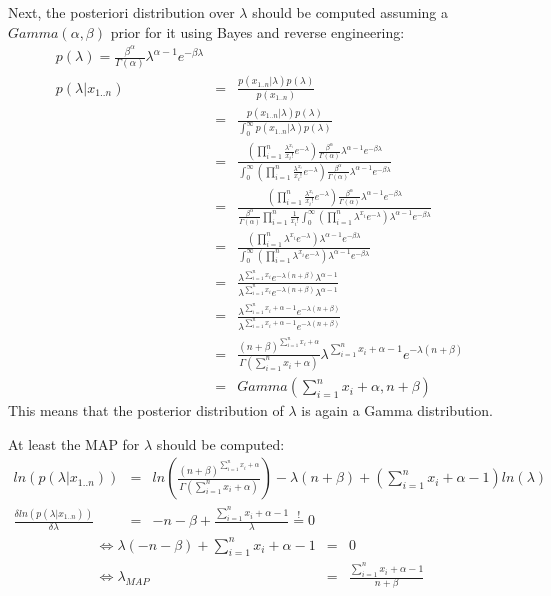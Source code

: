 \documentclass{article}
\begin{document}
Next, the posteriori distribution over $\lambda$ should be computed assuming a $Gamma(\alpha, \beta)$ prior for it using Bayes and reverse engineering:
\begin{eqnarray}
p(\lambda) = \frac{\beta^\alpha}{\Gamma(\alpha)} \lambda^{\alpha-1} e^{-\beta \lambda}\\
p(\lambda|x_{1..n}) &=& \frac{p(x_{1..n}|\lambda)p(\lambda)}{p(x_{1..n})}\\
&=& \frac{p(x_{1..n}|\lambda)p(\lambda)}{\int_0^\infty p(x_{1..n}|\lambda)p(\lambda)}\\
&=& \frac{\left(\prod_{i=1}^{n} \frac{\lambda^{x_i}}{x_i!}e^{-\lambda}\right)\frac{\beta^\alpha}{\Gamma(\alpha)} \lambda^{\alpha-1} e^{-\beta \lambda}}{\int_0^\infty \left(\prod_{i=1}^{n} \frac{\lambda^{x_i}}{x_i!}e^{-\lambda}\right)\frac{\beta^\alpha}{\Gamma(\alpha)} \lambda^{\alpha-1} e^{-\beta \lambda}}\\
&=& \frac{\left(\prod_{i=1}^{n} \frac{\lambda^{x_i}}{x_i!}e^{-\lambda}\right)\frac{\beta^\alpha}{\Gamma(\alpha)} \lambda^{\alpha-1} e^{-\beta \lambda}}{\frac{\beta^\alpha}{\Gamma(\alpha)} \prod_{i=1}^{n} \frac{1}{x_i!} \int_0^\infty \left(\prod_{i=1}^{n} \lambda^{x_i}e^{-\lambda}\right) \lambda^{\alpha-1} e^{-\beta \lambda}}\\
&=& \frac{\left(\prod_{i=1}^{n} \lambda^{x_i}e^{-\lambda}\right) \lambda^{\alpha-1} e^{-\beta \lambda}}{ \int_0^\infty \left(\prod_{i=1}^{n} \lambda^{x_i}e^{-\lambda}\right) \lambda^{\alpha-1} e^{-\beta \lambda}}\\
&=& \frac{\lambda^{\sum_{i=1}^n x_i} e^{-\lambda(n+\beta)} \lambda^{\alpha-1}}{ \lambda^{\sum_{i=1}^n x_i} e^{-\lambda(n+\beta)} \lambda^{\alpha-1}}\\
&=& \frac{\lambda^{\sum_{i=1}^n x_i + \alpha-1} e^{-\lambda(n+\beta)}}{ \lambda^{\sum_{i=1}^n x_i + \alpha-1} e^{-\lambda(n+\beta)}}\\
&=& \frac{(n+\beta)^{\sum_{i=1}^n x_i + \alpha}}{\Gamma(\sum_{i=1}^n x_i + \alpha)} \lambda^{\sum_{i=1}^n x_i + \alpha-1} e^{-\lambda(n+\beta)}\\
&=& Gamma(\sum_{i=1}^n x_i + \alpha, n+\beta)
\end{eqnarray}
This means that the posterior distribution of $\lambda$ is again a Gamma distribution.

At least the MAP for $\lambda$ should be computed:
\begin{eqnarray}
ln(p(\lambda|x_{1..n})) &=& ln\left(\frac{(n+\beta)^{\sum_{i=1}^n x_i + \alpha}}{\Gamma(\sum_{i=1}^n x_i + \alpha)}\right) - \lambda(n+\beta) + \left(\sum_{i=1}^n x_i + \alpha-1\right) ln(\lambda)\\
\frac{\delta ln(p(\lambda|x_{1..n}))}{\delta \lambda} &=& -n-\beta + \frac{\sum_{i=1}^n x_i + \alpha-1}{\lambda} \overset{!}{=} 0
\end{eqnarray}
\begin{eqnarray}
\Leftrightarrow \lambda(-n-\beta) + \sum_{i=1}^n x_i + \alpha-1 &=& 0\\
\Leftrightarrow \lambda_{MAP} &=& \frac{\sum_{i=1}^n x_i + \alpha-1}{n+\beta}
\end{eqnarray}
\end{document}

